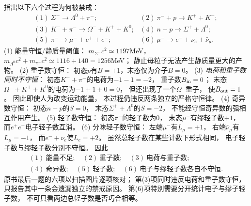 指出以下六个过程为何被禁戒：
\[
\begin{array}{ll}
(1)\ \Sigma^-\to\Lambda^0+\pi^-;&
(2)\ \pi^-+p\to K^++K^-;\\
(3)\ K^-+\pi^-\to\Omega^-+K^++K^0;&
(4)\ n+p\to\Sigma^++\Lambda^0;\\
(5)\ \pi^-\to\mu^-+e^++e^-;&
(6)\ \mu^-\to e^-+\nu_e+\bar\nu_\mu.
\end{array}
\]
\exsolution
(1) 能量守恒/静质量阈值：
$m_{\Sigma^-}c^2\simeq1197$MeV，
$m_{\Lambda^0}c^2+m_{\pi^-}c^2
\simeq1116+140=1256$MeV；
静止母粒子无法产生静质量更大的产物。
(2) 重子数守恒：
初态$p$有$B=+1$，末态仅为介子$B=0$。
(3) \emph{电荷和重子数同时不守恒}：
初态$K^-+\pi^-$的电荷为$-1-1=-2$，
重子数$B_{\rm in}=0$；
末态$\Omega^-+K^++K^0$的电荷为$-1+1+0=0$，
但还出现了一个$\Omega^-$重子，
使$B_{\rm out}=1$。
因此即使人为改变运动能量，
本过程仍违反两条独立的严格守恒律。
(4) 奇异数守恒：
初态$n+p$的$S=0$，
末态$\Sigma^++\Lambda^0$的$S=-2$，
不能经守恒奇异数的强相互作用产生。
(5) 轻子数守恒：
初态$\pi^-$的轻子数为0，
末态$\mu^-$有缪轻子数$+1$，
而$e^+e^-$电子轻子数互消。
(6) 分味轻子数守恒：
左端$\mu^-$有$L_\mu=+1$，
右端$\bar\nu_\mu$有$L_\mu=-1$，
而$e^-+\nu_e$使$L_e=+2$。
虽然总轻子数在某些计数下形式相同，
电子轻子数与缪轻子数分别不守恒。
因此
\[
 \boxed{\begin{array}{l}
 (1)\ \text{能量不足};\quad(2)\ \text{重子数};\quad
 (3)\ \text{电荷与重子数};\\
 (4)\ \text{奇异数};\quad(5)\ \text{轻子数};\quad
 (6)\ \text{电子与缪轻子数各自不守恒}.
 \end{array}}
\]
\excheck 原书最后一题的六项以扫描图片逐项核对；
第(3)项同时违反电荷和重子数守恒，
只报告其中一条会遗漏独立的禁戒原因。
第(6)项特别需要分开统计电子与缪子轻子数，
不可只看两边总轻子数是否巧合相等。
